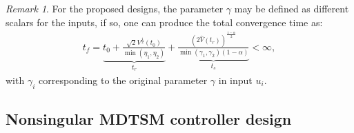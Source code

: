 \documentclass[3p]{elsarticle}
\theoremstyle{plain}
\theoremstyle{remark}
\newtheorem{myrem}{Remark}
\begin{document}
\begin{myrem}
For the proposed designs, the parameter $\gamma$ may be defined as different scalars for the inputs, if so, one can produce the total convergence time as:
\begin{align}
t_f = \underbrace{t_0+\frac{\sqrt{2}V^{\frac{1}{2}}(t_0)}{\min(\eta_1,\eta_2)}}_{t_r}+\underbrace{\frac{(2\hat V(t_r))^{\frac{1-\alpha}{2}}}{\min(\gamma_1,\gamma_2)(1-\alpha)}}_{t_s}<\infty,\label{eq:normal total convergence time}
\end{align}
with $\gamma_i$ corresponding to the original parameter $\gamma$ in input $u_i$.
\end{myrem}
\subsection{Nonsingular MDTSM controller design}
\end{document}
